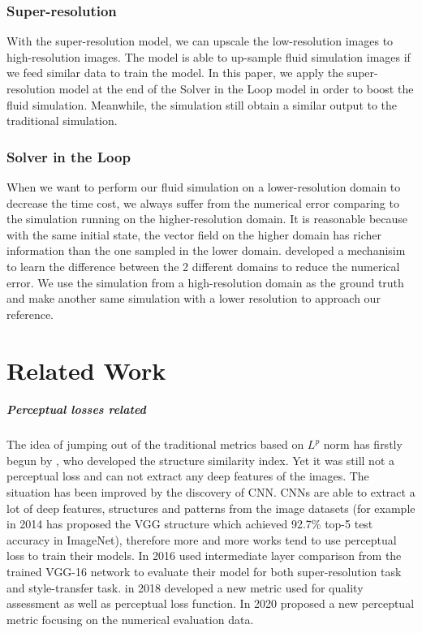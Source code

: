 \documentclass[a4paper,12pt,twoside]{report}
\begin{document}
\subsection{Super-resolution}
With the super-resolution model, we can upscale the low-resolution images to high-resolution images. The model is able to up-sample fluid simulation images if we feed similar data to train the model. In this paper, we apply the super-resolution model at the end of the Solver in the Loop model in order to boost the fluid simulation. Meanwhile, the simulation still obtain a similar output to the traditional simulation.
\subsection{Solver in the Loop}
When we want to perform our fluid simulation on a lower-resolution domain to decrease the time cost, we always suffer from the numerical error comparing to the simulation running on the higher-resolution domain. It is reasonable because with the same initial state, the vector field on the higher domain has richer information than the one sampled in the lower domain. \citeauthor{um2020sol} developed a mechanisim to learn the difference between the 2 different domains to reduce the numerical error.  We use the simulation from a high-resolution domain as the ground truth and make another same simulation with a lower resolution to approach our reference.  



\chapter{Related Work}
\paragraph{Perceptual losses related}The idea of jumping out of the traditional metrics based on $L^p$ norm has firstly begun by \cite{wang2004}, who developed the structure similarity index. Yet it was still not a perceptual loss and can not extract any deep features of the images. The situation has been improved by the discovery of CNN. CNNs are able to extract a lot of deep features, structures and patterns from the image datasets (for example in 2014 \cite{simonyan2014very} has proposed the VGG structure which achieved 92.7\% top-5 test accuracy in ImageNet), therefore more and more  works tend to use perceptual loss to train their models\cite{amirshahi2016, berardino2017, bosse2016, kang2014, kim2017}. In 2016 \cite{johnson2016perceptual} used intermediate layer comparison from the trained VGG-16 network to evaluate their model for both super-resolution task and style-transfer task.  in 2018 \cite{zhang2018perceptual} developed a new metric used for quality assessment as well as perceptual loss function. In 2020 \cite{kohl2020learning} proposed a new perceptual metric focusing on the numerical evaluation data.
\end{document}
